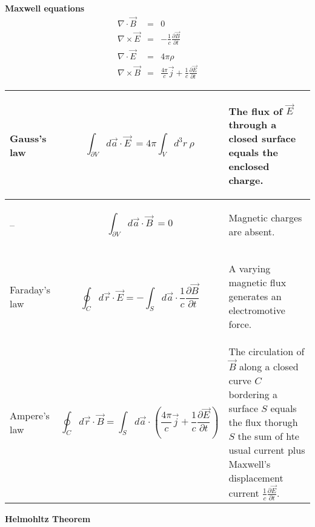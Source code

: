 \documentclass[12pt,a4paper]{article}
\newcommand{\pd}[2]{\frac{\partial #1}{\partial #2}} %
\newcommand{\integral}[3]{\int_{#1}^{#2} d #3 \ } %
\begin{document}
\textbf{Maxwell equations}
\begin{eqnarray}
	\nabla \cdot \vec{B} & = & 0 \\
	\nabla \times \vec{E} & = & -\frac{1}{c}\frac{\partial \vec{B}}{\partial t} \\ 
	\nabla \cdot \vec{E} & = & 4 \pi \rho \\
	\nabla \times \vec{B} & = &\frac{4\pi}{c}\vec{j} +\frac{1}{c}\frac{\partial \vec{E}}{\partial t}
\end{eqnarray}
\begin{center}
\begin{tabular}{ | p{} | p{}| p{} | } 
\hline 
Gauss's law & \begin{equation}
\integral{\partial V}{}{\vec{a}\cdot \vec{E}} = 4\pi\integral{V}{}{^3r} \rho
\end{equation} &  \begin{center}
The flux of $\vec{E}$ through a closed surface equals the enclosed charge.
\end{center} \\ 
\hline 
-- & \begin{equation}
\integral{\partial V}{}{\vec{a}\cdot \vec{B}} = 0
\end{equation} & \begin{center}
	Magnetic charges are absent.
\end{center}  \\ 
\hline 
Faraday's law & \begin{equation}
\oint_C d\vec{r} \cdot \vec{E} = -\int_S d\vec{a} \cdot \frac{1}{c}\pd{\vec{B}}{t}
\end{equation} & \begin{center}
A varying magnetic flux generates an electromotive force.
\end{center} \\ 
\hline 
Ampere's law & \begin{equation}
\oint_C d\vec{r} \cdot \vec{B} = \int_S d\vec{a}\cdot\left( \frac{4\pi}{c}\vec{j}+\frac{1}{c}\pd{\vec{E}}{t} \right) 
\end{equation}  & The circulation of $\vec{B}$
 along a closed curve $C$ bordering a surface $S$ equals the flux thorugh $S$ the sum of hte usual current plus Maxwell's displacement current $\frac{1}{c}\pd{\vec{E}}{t} $. \\ 
\hline 
\end{tabular} 

\end{center}
\textbf{Helmohltz Theorem}
\end{document}
